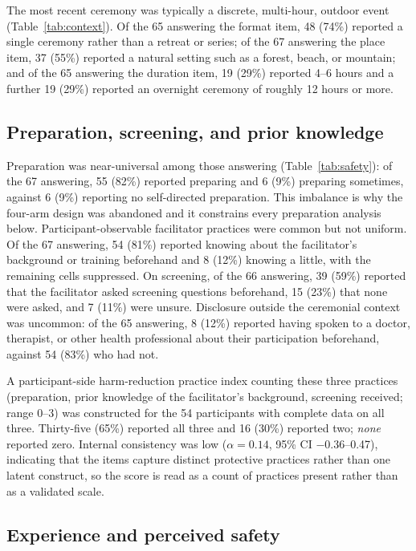 \documentclass[12pt]{article}
\begin{document}
The most recent ceremony was typically a discrete, multi-hour, outdoor event (Table~\ref{tab:context}). Of
the 65 answering the format item, 48 (74\%) reported a single ceremony rather than a retreat or series; of
the 67 answering the place item, 37 (55\%) reported a natural setting such as a forest, beach, or mountain;
and of the 65 answering the duration item, 19 (29\%) reported 4--6 hours and a further 19 (29\%) reported
an overnight ceremony of roughly 12 hours or more.

\subsection{Preparation, screening, and prior knowledge}

Preparation was near-universal among those answering (Table~\ref{tab:safety}): of the 67 answering, 55
(82\%) reported preparing and 6 (9\%) preparing sometimes, against 6 (9\%) reporting no self-directed
preparation. This imbalance is why the four-arm design was abandoned and it constrains every preparation
analysis below. Participant-observable facilitator practices were common but not uniform. Of the 67
answering, 54 (81\%) reported knowing about the facilitator's background or training beforehand and 8
(12\%) knowing a little, with the remaining cells suppressed. On screening, of the 66 answering, 39 (59\%)
reported that the facilitator asked screening questions beforehand, 15 (23\%) that none were asked, and 7
(11\%) were unsure. Disclosure outside the ceremonial context was uncommon: of the 65 answering, 8 (12\%)
reported having spoken to a doctor, therapist, or other health professional about their participation
beforehand, against 54 (83\%) who had not.

A participant-side harm-reduction practice index counting these three practices (preparation, prior
knowledge of the facilitator's background, screening received; range 0--3) was constructed for the 54
participants with complete data on all three. Thirty-five (65\%) reported all three and 16 (30\%) reported
two; \emph{none} reported zero. Internal consistency was low ($\alpha = 0.14$, 95\% CI $-0.36$--0.47),
indicating that the items capture distinct protective practices rather than one latent construct, so the
score is read as a count of practices present rather than as a validated scale.

\subsection{Experience and perceived safety}
\end{document}
